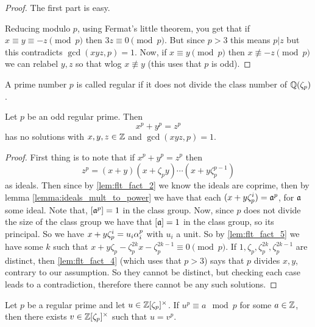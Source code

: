 \begin{proof}
The first part is easy.

Reducing modulo $p$, using Fermat's little theorem, you get that if $x \equiv y \equiv -z \pmod p$ then $3z \equiv 0 \pmod p$. But since $p >3$ this means $p |z$ but this contradicts $\gcd(xyz,p)=1$. Now, if $x \equiv y \pmod p$ then  $x \not \equiv -z \pmod p$ we can relabel $y,z$ so that wlog $x \not \equiv y$ (this uses that $p$ is odd).

\end{proof}

\begin{definition}\label{defn:is_regular_number}
	\leanok
	A prime number $p$ is called regular if it does not divide the class number of $\mathbb{Q}(\zeta_p)$.
\end{definition}


\begin{theorem}\label{theorem:FLT_case_one}
    \leanok
	Let $p$ be an odd regular prime. Then \[x^p+y^p=z^p\] has no solutions with $x,y,z \in \mathbb{Z}$ and $\gcd(xyz,p)=1$.
\end{theorem}
\begin{proof}
	First thing is to note that if $x^p+y^p=z^p$ then \[z^p=(x+y)(x+\zeta_py)\cdots(x+y\zeta_p^{p-1})\] as ideals. Then since by \ref{lem:flt_fact_2} we know the ideals are coprime, then by lemma \ref{lemma:ideals_mult_to_power} we have that each $(x+y\zeta_p^i)=\mathfrak{a}^p$, for $\mathfrak{a}$ some ideal. Note that, $[\mathfrak{a}^p]=1$ in the class group. Now, since $p$ does not divide the size of the class group we have that $[\mathfrak{a}]=1$ in the class group, so its principal. So we have $x+y\zeta_p^i=u_i\alpha_i^p$ with $u_i$ a unit. So by \ref{lem:flt_fact_5} we have some $k$ such that $x+y\zeta_p-\zeta_p^{2k}x-\zeta_p^{2k-1} \equiv 0 \pmod p$. If $1,\zeta_p,\zeta_p^{2k},\zeta_p^{2k-1}$ are distinct, then \ref{lem:flt_fact_4} (which uses that $p>3$) says that $p$  divides $x,y$, contrary to our assumption. So they cannot be distinct, but checking each case leads to a contradiction, therefore there cannot be any such solutions.
\end{proof}

\begin{theorem}\label{thm:Kummers_lemma}
	Let $p$ be a regular prime and let $u \in \mathbb{Z}[\zeta_p]^\times$. If $u^p \equiv a \mod p$ for some $a \in \mathbb{Z}$, then there exists $v \in \mathbb{Z}[\zeta_p]^\times$ such that $u=v^p$.
\end{theorem}	

